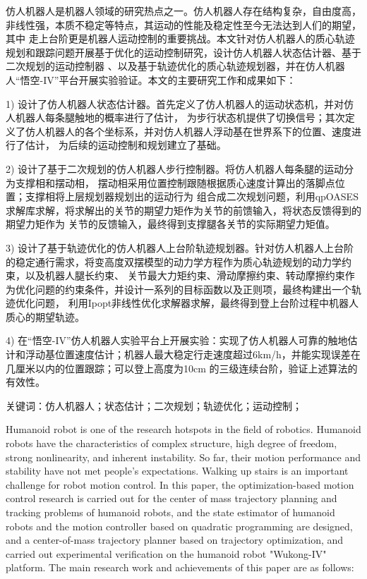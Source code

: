 \cleardoublepage
{}

仿人机器人是机器人领域的研究热点之一。仿人机器人存在结构复杂，自由度高，非线性强，本质不稳定等特点，其运动的性能及稳定性至今无法达到人们的期望，其中
走上台阶更是机器人运动控制的重要挑战。本文针对仿人机器人的质心轨迹规划和跟踪问题开展基于优化的运动控制研究，设计仿人机器人状态估计器、基于二次规划的运动控制器
、以及基于轨迹优化的质心轨迹规划器，并在仿人机器人“悟空-IV”平台开展实验验证。本文的主要研究工作和成果如下：

1) 设计了仿人机器人状态估计器。首先定义了仿人机器人的运动状态机，并对仿人机器人每条腿触地的概率进行了估计，
为步行状态机提供了切换信号；其次定义了仿人机器人的各个坐标系，并对仿人机器人浮动基在世界系下的位置、速度进行了估计，
为后续的运动控制和规划建立了基础。

2) 设计了基于二次规划的仿人机器人步行控制器。将仿人机器人每条腿的运动分为支撑相和摆动相，
摆动相采用位置控制跟随根据质心速度计算出的落脚点位置；支撑相将上层规划器规划出的运动行为
组合成二次规划问题，利用qpOASES求解库求解，将求解出的关节的期望力矩作为关节的前馈输入，将状态反馈得到的期望力矩作为
关节的反馈输入，最终得到支撑腿各关节的实际期望力矩值。

3) 设计了基于轨迹优化的仿人机器人上台阶轨迹规划器。针对仿人机器人上台阶的稳定通行需求，将变高度双摆模型的动力学方程作为质心轨迹规划的动力学约束，以及机器人腿长约束、
关节最大力矩约束、滑动摩擦约束、转动摩擦约束作为优化问题的约束条件，并设计一系列的目标函数以及正则项，最终构建出一个轨迹优化问题，
利用Ipopt非线性优化求解器求解，最终得到登上台阶过程中机器人质心的期望轨迹。

4) 在“悟空-IV”仿人机器人实验平台上开展实验：实现了仿人机器人可靠的触地估计和浮动基位置速度估计；机器人最大稳定行走速度超过6km/h，并能实现误差在几厘米以内的位置跟踪；可以登上高度为10cm
的三级连续台阶，验证上述算法的有效性。

$\textbf{关键词}$：仿人机器人；状态估计；二次规划；轨迹优化；运动控制；

\cleardoublepage
{}

Humanoid robot is one of the research hotspots in the field of robotics. Humanoid robots have the characteristics of complex structure, high degree of freedom, 
strong nonlinearity, and inherent instability. So far, their motion performance and stability have not met people's expectations. 
Walking up stairs is an important challenge for robot motion control. In this paper, the optimization-based motion control research is carried out 
for the center of mass trajectory planning and tracking problems of humanoid robots, and the state estimator of humanoid robots and the motion controller 
based on quadratic programming are designed, and a center-of-mass trajectory planner based on trajectory optimization, and carried out experimental verification 
on the humanoid robot "Wukong-IV" platform. The main research work and achievements of this paper are as follows:

